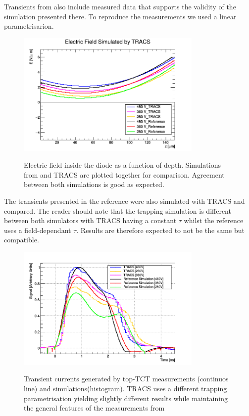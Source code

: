 Transients from \cite{Pholsen} also include measured data that supports the validity of the simulation presented there. To reproduce the measurements we used a linear parametrisarion.

\begin{figure}[H]
	\centering
	\includegraphics[width=0.8\textwidth]{Pohlsen_fields.png}
	\label{fig:CompFields}
	\caption{Electric field inside the diode as a function of depth. Simulations from \cite{Pholsen} and TRACS are plotted together for comparison. Agreement between both simulations is good as expected.}
\end{figure}

The transients presented in the reference were also simulated with TRACS and compared. The reader should note that the trapping simulation is different between both simulators with TRACS having a constant $\tau$ whilst the reference uses a field-dependant $\tau$. Results are therefore expected to not be the same but compatible.

\begin{figure}[H]
	\centering
	\includegraphics[width=0.8\textwidth]{Pohlsen_scr.png}
	\label{fig:mues2}
	\caption{Transient currents generated by top-TCT measurements (continuos line) and simulations(histogram). TRACS uses a different trapping parametrisation yielding slightly different results while maintaining the general features of the measurements from \cite{Pholsen}}
\end{figure}


